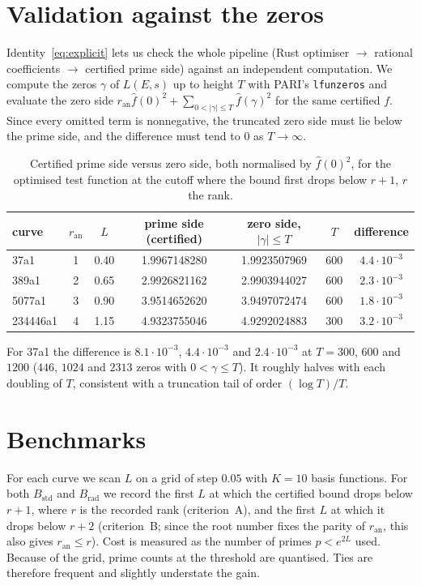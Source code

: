 \documentclass[11pt]{amsart}
\theoremstyle{remark}
\theoremstyle{definition}
\newcommand{\ran}{r_{\mathrm{an}}}
\begin{document}
\section{Validation against the zeros}\label{sec:zeros}

Identity~\eqref{eq:explicit} lets us check the whole pipeline (Rust optimiser $\to$ rational coefficients $\to$ certified prime side) against an independent computation. We compute the zeros $\gamma$ of $L(E,s)$ up to height $T$ with PARI's \texttt{lfunzeros} and evaluate the zero side $\ran\hat f(0)^2+\sum_{0<|\gamma|\le T}\hat f(\gamma)^2$ for the same certified $f$. Since every omitted term is nonnegative, the truncated zero side must lie below the prime side, and the difference must tend to $0$ as $T\to\infty$.

\begin{table}[h]
\centering\small
\begin{tabular}{lcccccc}
\toprule
curve & $\ran$ & $L$ & prime side (certified) & zero side, $|\gamma|\le T$ & $T$ & difference\\
\midrule
37a1     & 1 & 0.40 & 1.9967148280 & 1.9923507969 & 600 & $4.4\cdot10^{-3}$\\
389a1    & 2 & 0.65 & 2.9926821162 & 2.9903944027 & 600 & $2.3\cdot10^{-3}$\\
5077a1   & 3 & 0.90 & 3.9514652620 & 3.9497072474 & 600 & $1.8\cdot10^{-3}$\\
234446a1 & 4 & 1.15 & 4.9323755046 & 4.9292024883 & 300 & $3.2\cdot10^{-3}$\\
\bottomrule
\end{tabular}
\caption{Certified prime side versus zero side, both normalised by $\hat f(0)^2$, for the optimised test function at the cutoff where the bound first drops below $r+1$, $r$ the rank.}
\label{tab:zeros}
\end{table}

For 37a1 the difference is $8.1\cdot10^{-3}$, $4.4\cdot10^{-3}$ and $2.4\cdot10^{-3}$ at $T=300$, $600$ and $1200$ ($446$, $1024$ and $2313$ zeros with $0<\gamma\le T$). It roughly halves with each doubling of $T$, consistent with a truncation tail of order $(\log T)/T$.

\section{Benchmarks}\label{sec:bench}

For each curve we scan $L$ on a grid of step $0.05$ with $K=10$ basis functions. For both $B_{\mathrm{std}}$ and $B_{\mathrm{rad}}$ we record the first $L$ at which the certified bound drops below $r+1$, where $r$ is the recorded rank (criterion~A), and the first $L$ at which it drops below $r+2$ (criterion~B; since the root number fixes the parity of $\ran$, this also gives $\ran\le r$). Cost is measured as the number of primes $p<e^{2L}$ used. Because of the grid, prime counts at the threshold are quantised. Ties are therefore frequent and slightly understate the gain.
\end{document}
